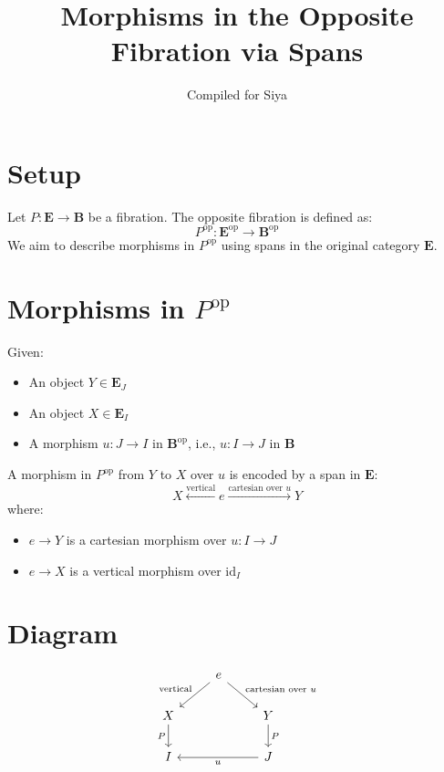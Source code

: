 \documentclass[12pt]{article}
\title{Morphisms in the Opposite Fibration via Spans}
\author{Compiled for Siya}
\date{}
\begin{document}
	
	\maketitle
	
	\section*{Setup}
	
	Let \( P : \mathbf{E} \to \mathbf{B} \) be a fibration. The opposite fibration is defined as:
	\[
	P^{\mathrm{op}} : \mathbf{E}^{\mathrm{op}} \to \mathbf{B}^{\mathrm{op}}
	\]
	We aim to describe morphisms in \( P^{\mathrm{op}} \) using spans in the original category \( \mathbf{E} \).
	
	\section*{Morphisms in \( P^{\mathrm{op}} \)}
	
	Given:
	\begin{itemize}
		\item An object \( Y \in \mathbf{E}_J \)
		\item An object \( X \in \mathbf{E}_I \)
		\item A morphism \( u : J \to I \) in \( \mathbf{B}^{\mathrm{op}} \), i.e., \( u : I \to J \) in \( \mathbf{B} \)
	\end{itemize}
	
	A morphism in \( P^{\mathrm{op}} \) from \( Y \) to \( X \) over \( u \) is encoded by a span in \( \mathbf{E} \):
	\[
	X \xleftarrow{\text{vertical}} e \xrightarrow{\text{cartesian over } u} Y
	\]
	where:
	\begin{itemize}
		\item \( e \to Y \) is a cartesian morphism over \( u : I \to J \)
		\item \( e \to X \) is a vertical morphism over \( \mathrm{id}_I \)
	\end{itemize}
	
	\section*{Diagram}
	
	\[
	\begin{tikzcd}
		& e \arrow[dl, "\text{vertical}"'] \arrow[dr, "\text{cartesian over } u"] & \\
		X \arrow[d, "P"'] & & Y \arrow[d, "P"] \\
		I & & J \arrow[ll, "u"]
	\end{tikzcd}
	\]
	
\end{document}
